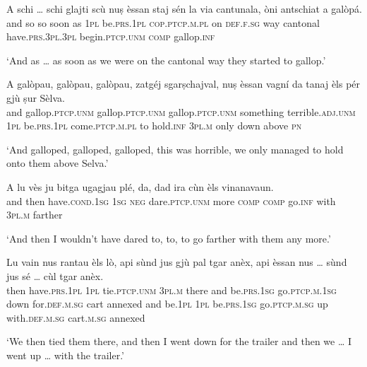 \begin{linenumbers}
\gll  A schi … schi glajti scù nuṣ èssan staj sén la via cantunala, òni antschiat a galòpá.  \\
and so {} so soon as \textsc{1pl} be.\textsc{prs.1pl} \textsc{cop.ptcp.m.pl} on \textsc{def.f.sg} way cantonal have.\textsc{prs.3pl.3pl} begin.\textsc{ptcp.unm} \textsc{comp} gallop.\textsc{inf}\\
\end{linenumbers}
\medskip
\glt `And as … as soon as we were on the cantonal way they started to gallop.'
\medskip

\begin{linenumbers}
\gll  A galòpau, galòpau, galòpau, zatgéj sgarṣchajval, nuṣ èssan vagní da tanaj èls pér gjù ṣur Sèlva\footnotemark.  \\ 
and gallop.\textsc{ptcp.unm} gallop.\textsc{ptcp.unm} gallop.\textsc{ptcp.unm} something terrible.\textsc{adj.unm} \textsc{1pl} be.\textsc{prs.1pl} come.\textsc{ptcp.m.pl}   to hold.\textsc{inf} \textsc{3pl.m} only down above \textsc{pn}  \\
\end{linenumbers}
\medskip
\glt `And galloped, galloped, galloped, this was horrible, we only managed to hold onto them above Selva.'
\medskip

\begin{linenumbers}
\gll  A lu vès ju bitga ugagjau plé, da, dad ira cùn èls vinanavaun.\\
and then have.\textsc{cond.1sg} \textsc{1sg} \textsc{neg} dare.\textsc{ptcp.unm} more \textsc{comp} \textsc{comp} go.\textsc{inf} with \textsc{3pl.m} farther\\
\end{linenumbers}
\medskip
\glt `And then I wouldn’t have dared to, to, to go farther with them any more.'
\medskip

\begin{linenumbers}
\gll Lu vain nus rantau èls lò, api sùnd jus gjù pal tgar anèx, api èssan nus … sùnd jus sé … cùl tgar anèx.\\
then have.\textsc{prs.1pl} \textsc{1pl} tie.\textsc{ptcp.unm} \textsc{3pl.m} there and be.\textsc{prs.1sg} go.\textsc{ptcp.m.1sg} down for.\textsc{def.m.sg} cart annexed and be.\textsc{1pl} \textsc{1pl} {} be.\textsc{prs.1sg} go.\textsc{ptcp.m.sg} up {} with.\textsc{def.m.sg} cart.\textsc{m.sg} annexed \\
\end{linenumbers}
\medskip
\glt `We then tied them there, and then I went down for the trailer and then we … I went up … with the trailer.'
\medskip

